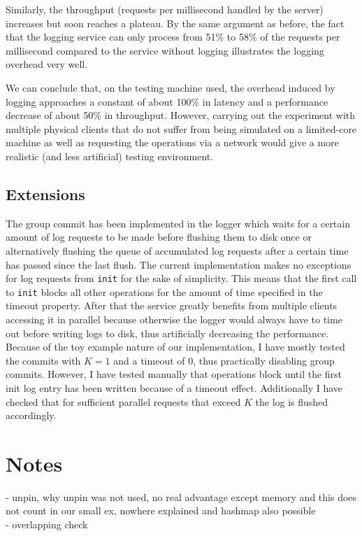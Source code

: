 \documentclass[a4paper,11pt]{article}
\begin{document}
Similarly, the throughput (requests per millisecond handled by the server) increases but soon reaches a plateau. By the same argument as before, the fact that the logging service can only process from 51\% to 58\% of the requests per millisecond compared to the service without logging illustrates the logging overhead very well.

We can conclude that, on the testing machine used, the overhead induced by logging approaches a constant of about 100\% in latency and a performance decrease of about 50\% in throughput. However, carrying out the experiment with multiple physical clients that do not suffer from being simulated on a limited-core machine as well as requesting the operations via a network would give a more realistic (and less artificial) testing environment.

\subsection{Extensions}
\label{sec:pt5}
The group commit has been implemented in the logger which waits for a certain amount of log requests to be made before flushing them to disk once or alternatively flushing the queue of accumulated log requests after a certain time has passed since the last flush. The current implementation makes no exceptions for log requests from \texttt{init} for the sake of simplicity. This means that the first call to \texttt{init} blocks all other operations for the amount of time specified in the timeout property. After that the service greatly benefits from multiple clients accessing it in parallel because otherwise the logger would always have to time out before writing logs to disk, thus artificially decreasing the performance. Because of the toy example nature of our implementation, I have mostly tested the commits with \(K=1\) and a timeout of 0, thus practically disabling group commits. However, I have tested manually that operations block until the first init log entry has been written because of a timeout effect. Additionally I have checked that for sufficient parallel requests that exceed \(K\) the log is flushed accordingly.

\section{Notes}
\label{sec:notes}
- unpin, why unpin was not used, no real advantage except memory and this does not count in our small ex, nowhere explained and hashmap also possible\\
- overlapping check
\end{document}
